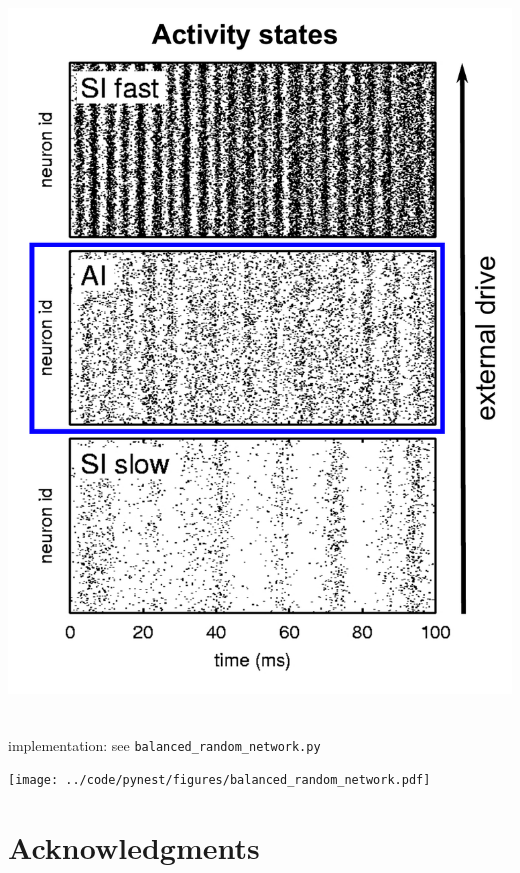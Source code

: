 \documentclass[8pt,t,usepdftitle=false]{beamer}
\begin{document}
\begin{frame}[t,plain]
\begin{columns}
{      \includegraphics[width=\linewidth]{figures/brunel_all_states_mod.pdf}
    }
  \end{columns}
\end{frame}
\begin{frame}[t,plain]
  \frametitle{\ttl}
  implementation: see \texttt{balanced\_random\_network.py}
  \begin{center}
    \texttt{[image: ../code/pynest/figures/balanced\_random\_network.pdf]}
  \end{center}
\end{frame}
\def\ttl{Acknowledgments}\section*{\ttl}
\end{document}
